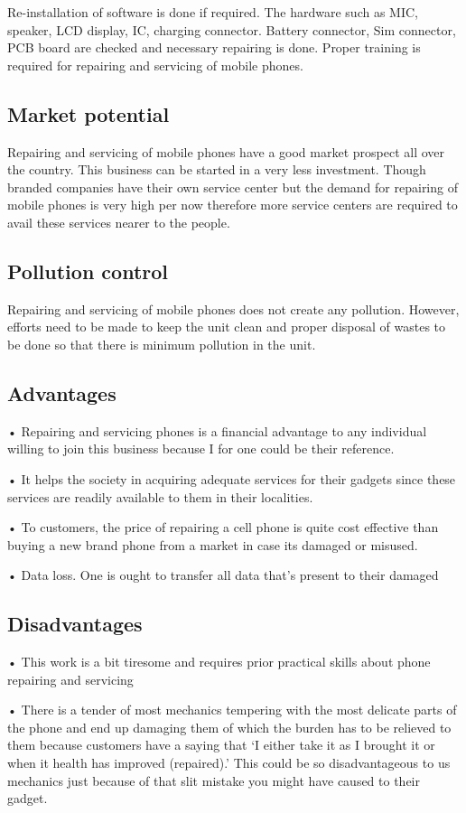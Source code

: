 \documentclass[12pt,letterpaper]{article}
\begin{document}
Re-installation of software is done if required. The hardware such as MIC, speaker, LCD display, IC, charging connector. Battery connector, Sim connector, PCB board are checked and necessary repairing is done. Proper training is required for repairing and servicing of mobile phones.
\subsection{Market potential}
Repairing and servicing of mobile phones have a good market prospect all over the country. This business can be started in a very less investment. Though branded companies have their own service center but the demand for repairing of mobile phones is very high per now therefore more service centers are required to avail these services nearer to the people.
\subsection{Pollution control}
Repairing and servicing of mobile phones does not create any pollution. However, efforts need to be made to keep the unit clean and proper disposal of wastes to be done so that there is minimum pollution in the unit.
\subsection{Advantages}

•	Repairing and servicing phones is a financial advantage to any individual willing to join this business because I for one could be their reference.

•	It helps the society in acquiring adequate services for their gadgets since these services are readily available to them in their localities.

•	To customers, the price of repairing a cell phone is quite cost effective than buying a new brand phone from a market in case its damaged or misused.

•	Data loss. One is ought to transfer all data that's present to their damaged

\subsection{Disadvantages}

•	This work is a bit tiresome and requires prior practical skills about phone repairing and servicing

•	There is a tender of most mechanics tempering with the most delicate parts of the phone and end up damaging them of which the burden has to be relieved to them because customers have a saying that ‘I either take it as I brought it or when it health has improved (repaired).’ This could be so disadvantageous to us mechanics just because of that slit mistake you might have caused to their gadget.
\end{document}
